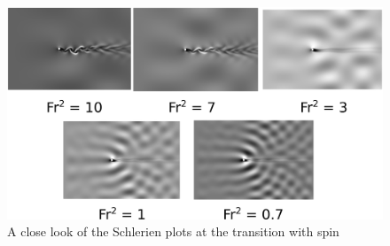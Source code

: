 \begin{figure}
    \centering
    \includegraphics[width = \textwidth]{images/circle/circleschlerien2.png}
    \caption{A close look of the Schlerien plots at the transition with spin}
    \label{fig:circleschlerien2}
\end{figure}




\clearpage
